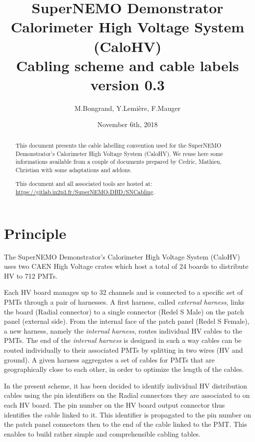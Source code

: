 \documentclass[12pt,a4paper]{article}
\title{SuperNEMO Demonstrator\\
  Calorimeter High Voltage System (CaloHV)\\
  Cabling scheme and cable labels\\
  version 0.3}
\author{M.Bongrand, Y.Lemi\`ere, F.Mauger}
\date{November 6th, 2018}
\begin{document}
\maketitle

\begin{abstract}
  \noindent This document presents the cable labelling convention used
  for  the SuperNEMO  Demonstrator's Calorimeter  High Voltage  System
  (CaloHV).  We reuse  here some informations available  from a couple
  of documents prepared  by Cedric, Mathieu, Christian  with some adaptations
  and addons.

  \vskip 10pt
  \noindent This document and all associated tools
  are hosted at:
  \vskip 5pt
  \url{https://gitlab.in2p3.fr/SuperNEMO-DBD/SNCabling}.
  
\end{abstract}

\tableofcontents
\vfill

\clearpage
\section{Principle}

The SuperNEMO Demonstrator's Calorimeter  High Voltage System (CaloHV)
uses two CAEN High  Voltage crates which host a total  of 24 boards to
distribute HV to 712 PMTs.

Each HV board manages up to 32 channels and is connected to a specific
set of  PMTs through  a pair  of harnesses.   A first  harness, called
\emph{external  harness},  links the  board  (Radial  connector) to  a
single  connector  (Redel  S  Male)   on  the  patch  panel  (external
side). From the  internal face of the patch panel  (Redel S Female), a
new harness, namely the  \emph{internal harness}, routes individual HV
cables  to  the PMTs.   The  end  of  the \emph{internal  harness}  is
designed in  such a  way cables  can be  routed individually  to their
associated PMTs  by splitting in two  wires (HV and ground).   A given
harness aggregates  a set of  cables for PMTs that  are geographically
close to each other, in order to optimize the length of the cables.

In the present  scheme, it has been decided to  identify individual HV
distribution cables using the pin identifiers on the Radial connectors
they are  associated to on  each HV board.  The  pin number on  the HV
board output connector  thus identifies the cable linked  to it.  This
identifier  is  propagated  to  the  pin number  on  the  patch  panel
connectors  then to  the end  of the  cable linked  to the  PMT.  This
enables to build rather simple and comprehensible cabling tables.
\end{document}
